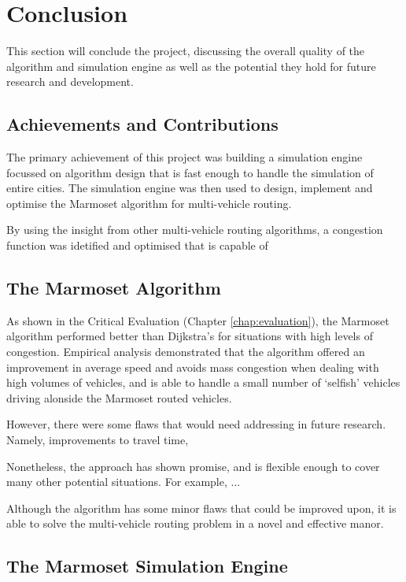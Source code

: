 \documentclass[ %
                    author={Alexander Hill},
                supervisor={Dr. Benjamin Sach},
                    degree={MEng},
                     title={MARMOSET},
                  subtitle={Multi-Agent Route Management using Online Simulation for Efficient Transportation},
                      type={research},
                      year={2016} ]{dissertation}
\begin{document}

\chapter{Conclusion}
\label{chap:conclusion}

This section will conclude the project, discussing the overall quality of the
algorithm and simulation engine as well as the potential they hold for future
research and development.

\section{Achievements and Contributions}

The primary achievement of this project was building a simulation engine focussed
on algorithm design that is fast enough to handle the simulation of entire cities.
The simulation engine was then used to design, implement and optimise the
Marmoset algorithm for multi-vehicle routing.

By using the insight from other multi-vehicle routing algorithms, a
congestion function was idetified and optimised that is capable of

\section{The Marmoset Algorithm}

As shown in the Critical Evaluation (Chapter \ref{chap:evaluation}), the
Marmoset algorithm performed better than Dijkstra's for situations with high
levels of congestion. Empirical analysis demonstrated that the algorithm offered
an improvement in average speed and avoids mass congestion when dealing with
high volumes of vehicles, and is able to handle a small number of `selfish'
vehicles driving alonside the Marmoset routed vehicles.

However, there were some flaws that would need addressing in future research.
Namely, improvements to travel time,

Nonetheless, the approach has shown promise, and is flexible enough to cover
many other potential situations. For example, ...

Although the algorithm has some minor flaws that could be improved upon, it is
able to solve the multi-vehicle routing problem in a novel and effective manor.

\section{The Marmoset Simulation Engine}
\end{document}

